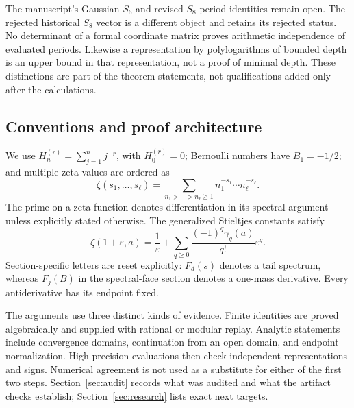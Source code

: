 The manuscript's Gaussian $S_6$ and revised $S_8$ period identities
remain open. The rejected historical $S_8$ vector is a different object
and retains its rejected status. No determinant of a formal coordinate
matrix proves arithmetic independence of evaluated periods. Likewise a
representation by polylogarithms of bounded depth is an upper bound in
that representation, not a proof of minimal depth. These distinctions
are part of the theorem statements, not qualifications added only after
the calculations.

\subsection{Conventions and proof architecture}

We use $H_n^{(r)}=\sum_{j=1}^n j^{-r}$, with $H_0^{(r)}=0$;
Bernoulli numbers have $B_1=-1/2$; and multiple zeta values are ordered
as
\[
 \zeta(s_1,\ldots,s_\ell)
 =\sum_{n_1>\cdots>n_\ell\ge1}
                         n_1^{-s_1}\cdots n_\ell^{-s_\ell}.
\]
The prime on a zeta function denotes differentiation in its spectral
argument unless explicitly stated otherwise. The generalized Stieltjes
constants satisfy
\[
 \zeta(1+\varepsilon,a)=\frac1\varepsilon+
       \sum_{q\ge0}\frac{(-1)^q\gamma_q(a)}{q!}\varepsilon^q.
\]
Section-specific letters are reset explicitly: $F_d(s)$ denotes a tail
spectrum, whereas $F_j(B)$ in the spectral-face section denotes a
one-mass derivative. Every antiderivative has its endpoint fixed.

The arguments use three distinct kinds of evidence. Finite identities
are proved algebraically and supplied with rational or modular replay.
Analytic statements include convergence domains, continuation from an
open domain, and endpoint normalization. High-precision evaluations
then check independent representations and signs. Numerical agreement
is not used as a substitute for either of the first two steps.
Section~\ref{sec:audit} records what was audited and what the artifact
checks establish; Section~\ref{sec:research} lists exact next targets.
